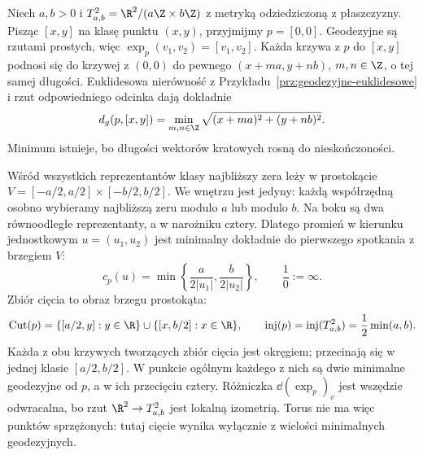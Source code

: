 \begin{przyklad}
\label{prz:ciecie-torus}
Niech $a,b>0$ i
$T^2_{a,b}=\R^2/(a\Z\times b\Z)$ z metryką
odziedziczoną z płaszczyzny. Pisząc $[x,y]$
na klasę punktu $(x,y)$, przyjmijmy $p=[0,0]$.
Geodezyjne są rzutami prostych, więc
$\exp_p(v_1,v_2)=[v_1,v_2]$.
Każda krzywa z $p$ do $[x,y]$ podnosi się do
krzywej z $(0,0)$ do pewnego
$(x+ma,y+nb)$, $m,n\in\Z$, o tej samej długości.
Euklidesowa nierówność z
Przykładu~\ref{prz:geodezyjne-euklidesowe}
i rzut odpowiedniego odcinka dają dokładnie
\begin{equation}\label{eq:odleglosc-torus-ciecie}
 d_g(p,[x,y])
 =\min_{m,n\in\Z}
   \sqrt{(x+ma)^2+(y+nb)^2}.
\end{equation}
Minimum istnieje, bo długości wektorów kratowych
rosną do nieskończoności.

Wśród wszystkich reprezentantów klasy najbliższy
zera leży w prostokącie
$V=[-a/2,a/2]\times[-b/2,b/2]$.
We wnętrzu jest jedyny: każdą współrzędną
osobno wybieramy najbliższą zeru modulo $a$
lub modulo $b$. Na boku są dwa równoodległe
reprezentanty, a w narożniku cztery.
Dlatego promień w kierunku jednostkowym
$u=(u_1,u_2)$ jest minimalny dokładnie do
pierwszego spotkania z brzegiem $V$:
\[
 c_p(u)=
 \min\left\{\frac{a}{2|u_1|},
             \frac{b}{2|u_2|}\right\},
 \qquad \frac1{0}:=\infty.
\]
Zbiór cięcia to obraz brzegu prostokąta:
\[
 \operatorname{Cut}(p)
 =\{[a/2,y]:y\in\R\}
   \cup\{[x,b/2]:x\in\R\},
 \qquad
 \operatorname{inj}(p)
 =\operatorname{inj}(T^2_{a,b})
 =\frac12\min(a,b).
\]
Każda z obu krzywych tworzących zbiór cięcia
jest okręgiem; przecinają się w jednej
klasie $[a/2,b/2]$.
W punkcie ogólnym każdego z nich są dwie
minimalne geodezyjne od $p$, a w ich przecięciu
cztery. Różniczka $\dd(\exp_p)_v$ jest wszędzie
odwracalna, bo rzut $\R^2\to T^2_{a,b}$
jest lokalną izometrią. Torus nie ma więc
punktów sprzężonych: tutaj cięcie wynika
wyłącznie z wielości minimalnych geodezyjnych.
\end{przyklad}

